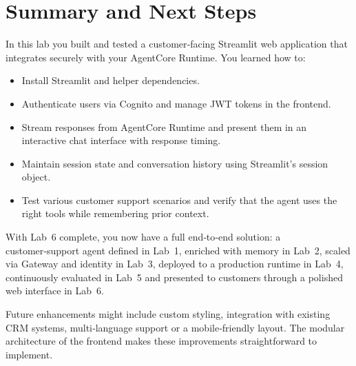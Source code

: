 \section{Summary and Next Steps}

In this lab you built and tested a customer‑facing Streamlit web
application that integrates securely with your AgentCore Runtime.  You
learned how to:

\begin{itemize}
  \item Install Streamlit and helper dependencies.
  \item Authenticate users via Cognito and manage JWT tokens in the
        frontend.
  \item Stream responses from AgentCore Runtime and present them in
        an interactive chat interface with response timing.
  \item Maintain session state and conversation history using
        Streamlit’s session object.
  \item Test various customer support scenarios and verify that the
        agent uses the right tools while remembering prior context.
\end{itemize}

With Lab 6 complete, you now have a full end‑to‑end solution: a
customer‑support agent defined in Lab 1, enriched with memory in
Lab 2, scaled via Gateway and identity in Lab 3, deployed to a
production runtime in Lab 4, continuously evaluated in Lab 5 and
presented to customers through a polished web interface in Lab 6.

Future enhancements might include custom styling, integration with
existing CRM systems, multi‑language support or a mobile‑friendly
layout.  The modular architecture of the frontend makes these
improvements straightforward to implement.

